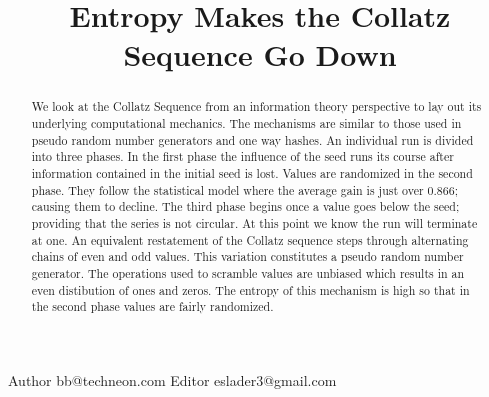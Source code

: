 \documentclass[preprint]{sigplanconf}
\begin{document}


\title{Entropy Makes the Collatz Sequence Go Down}

{Author}
{bb@techneon.com}
{Editor}
{eslader3@gmail.com}

\maketitle

\begin{abstract}
    We look at the Collatz Sequence from an information theory perspective to lay out its underlying computational mechanics. The mechanisms are similar to those used in pseudo random number generators and one way hashes.
    An individual run is divided into three phases.  In the first phase the influence of the seed runs its course after information contained in the initial seed is lost.  Values are randomized in the second phase.  They follow the statistical model where the average gain is just over 0.866; causing them to decline.  The third phase begins once a value goes below the seed; providing that the series is not circular.  At this point we know the run will terminate at one.
    An equivalent restatement of the Collatz sequence steps through alternating chains of even and odd values.  This variation constitutes a pseudo random number generator.  The operations used to scramble values are unbiased which results in an even distibution of ones and zeros.  The entropy of this mechanism is high so that in the second phase values are fairly randomized.
\end{abstract}



\end{document}

